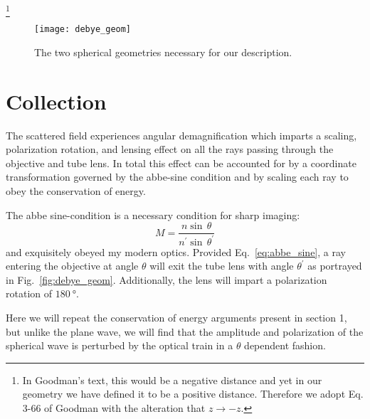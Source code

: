 \footnote{In Goodman's text\cite{goodman05}, this would be a negative
  distance and yet in our geometry we have defined it to be a positive distance.
  Therefore we adopt Eq. 3-66 of Goodman with the alteration that  $z \rightarrow -z$.}



\begin{figure}
  \centering
  \texttt{[image: debye\_geom]}
  \caption{The two spherical geometries necessary for our description.}
  \label{fig:debye_schematic}
\end{figure}

\section{Collection}
The scattered field experiences angular demagnification 
which imparts a scaling, polarization rotation, and lensing effect on all the rays passing
through the objective and tube lens. In total this effect can be accounted for by
a coordinate transformation governed by the abbe-sine condition and by scaling
each ray to obey the conservation of energy.

The abbe sine-condition is a necessary condition for sharp imaging:
\begin{equation*}
  M = \frac{n \sin \, \theta}{n^{\prime} \sin \, \theta^{\prime}}
  \label{eq:abbe_sine}
\end{equation*}
  and exquisitely obeyed my modern optics. Provided Eq.~\eqref{eq:abbe_sine}, a ray entering
  the objective at angle $\theta$ will exit the tube lens with angle $\theta^{\prime}$ as
  portrayed in Fig.~\ref{fig:debye_geom}. Additionally, the lens will impart a polarization
  rotation of $\SI{180}{\degree}$.

Here we will repeat the conservation of energy arguments present in section
1, but unlike the plane wave, we will find that the amplitude and 
polarization of the spherical wave is perturbed by the optical train in a 
$\theta$ dependent fashion. 


